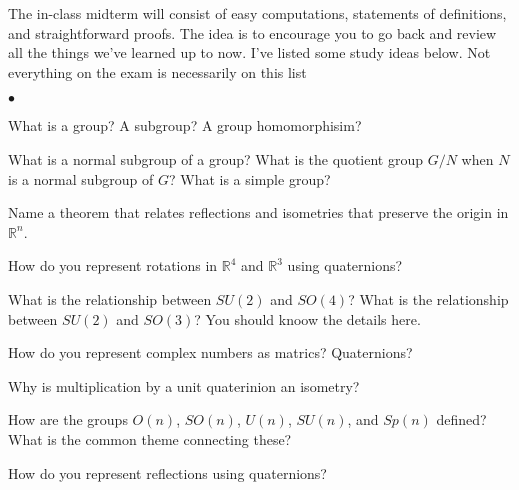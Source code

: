 \documentclass[minion,handout]{homework}
\newcommand{\Reals}{\mathbb{R}}
\newenvironment{clist}%
{\bgroup\parskip 0pt\begin{list}{$\bullet$}{\partopsep 10pt\topsep 0pt\itemsep 0pt}}%
{\end{list}\egroup}%
\begin{document}
The in-class midterm will consist of easy computations, statements of definitions,  and straightforward proofs.  The idea is to encourage you to go back
and review all the things we've learned up to now.  I've listed some study ideas below.
Not everything on the exam is necessarily on this list

\begin{clist}

\item What is a group? A subgroup? A group homomorphisim?

\item What is a normal subgroup of a group?  What is the quotient group $G/N$ when
$N$ is a normal subgroup of $G$? What is a simple group? 

\item Name a theorem that relates reflections and isometries that
preserve the origin in $\Reals^n$.

\item How do you represent rotations in $\Reals^4$ and $\Reals^3$ using quaternions?

\item What is the relationship between $SU(2)$ and $SO(4)$?  What is the relationship between
$SU(2)$ and $SO(3)$?  You should knoow the details here.

\item How do you represent complex numbers as matrics?  Quaternions?

\item Why is multiplication by a unit quaterinion an isometry?

\item How are the groups $O(n)$, $SO(n)$, $U(n)$, $SU(n)$, and $Sp(n)$ defined?
What is the common theme connecting these?


\item How do you represent reflections using quaternions?

\end{clist}
\end{document}
